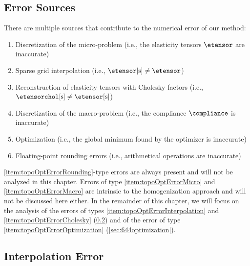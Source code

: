 \subsection{Error Sources}
\label{sec:642errorSources}

There are multiple sources that contribute to the numerical error
of our method:

\begin{enumerate}[label=E\arabic*.,ref=E\arabic*,leftmargin=2.7em]
  \item
  \label{item:topoOptErrorMicro}
  Discretization of the micro-problem
  (i.e., the elasticity tensors $\etensor$ are inaccurate)
  
  \item
  \label{item:topoOptErrorInterpolation}
  Sparse grid interpolation
  (i.e., $\etensorintp \not= \etensor$)
  
  \item
  \label{item:topoOptErrorCholesky}
  Reconstruction of elasticity tensors with Cholesky factors
  (i.e., $\etensorcholintp \not= \etensorintp$)
  
  \item
  \label{item:topoOptErrorMacro}
  Discretization of the macro-problem
  (i.e., the compliance $\compliance$ is inaccurate)
  
  \item
  \label{item:topoOptErrorOptimization}
  Optimization
  (i.e., the global minimum found by the optimizer is inaccurate)
  
  \item
  \label{item:topoOptErrorRounding}
  Floating-point rounding errors
  (i.e., arithmetical operations are inaccurate)
\end{enumerate}

\noindent
\ref{item:topoOptErrorRounding}-type errors are always present and
will not be analyzed in this chapter.
Errors of type \ref{item:topoOptErrorMicro} and \ref{item:topoOptErrorMacro}
are intrinsic to the homogenization approach
and will not be discussed here either.
In the remainder of this chapter,
we will focus on the analysis of the errors of types
\ref{item:topoOptErrorInterpolation} and \ref{item:topoOptErrorCholesky}
(\cref{sec:643interpolation})
and of the error of type \ref{item:topoOptErrorOptimization}
(\cref{sec:644optimization}).



\subsection{Interpolation Error}
\label{sec:643interpolation}

